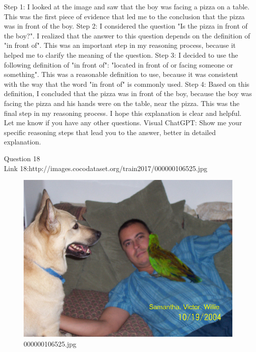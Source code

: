 \begin{enumerate}
        Step 1: I looked at the image and saw that the boy was facing a pizza on a table. This was the first piece of evidence that led me to the conclusion that the pizza was in front of the boy.
        Step 2: I considered the question "Is the pizza in front of the boy?". I realized that the answer to this question depends on the definition of "in front of". This was an important step in my reasoning process, because it helped me to clarify the meaning of the question.
        Step 3: I decided to use the following definition of "in front of": "located in front of or facing someone or something". This was a reasonable definition to use, because it was consistent with the way that the word "in front of" is commonly used.
        Step 4: Based on this definition, I concluded that the pizza was in front of the boy, because the boy was facing the pizza and his hands were on the table, near the pizza. This was the final step in my reasoning process.
        I hope this explanation is clear and helpful. Let me know if you have any other questions.
        \subitem Visual ChatGPT: Show me your specific reasoning steps that lead you to the answer, better in detailed explanation.
    \end{enumerate}
Question 18\\
Link 18:http://images.cocodataset.org/train2017/000000106525.jpg
    \begin{figure}[h]
        \centering
        \includegraphics[width=0.8\linewidth]{../image set/easy/000000106525.jpg}
        \caption{000000106525.jpg}
    \end{figure}
